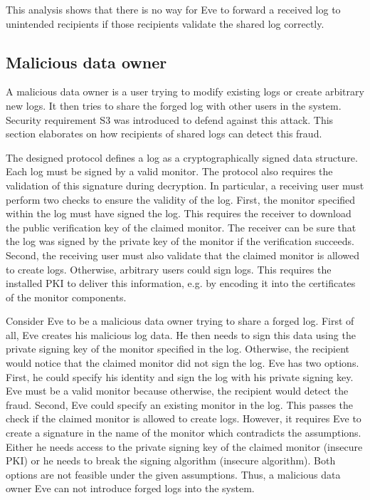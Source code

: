 \documentclass[../main.tex]{subfiles}
\begin{document}
This analysis shows that there is no way for Eve to forward a received log to unintended recipients if those recipients validate the shared log correctly.


\subsection{Malicious data owner}
A malicious data owner is a user trying to modify existing logs or create arbitrary new logs.
It then tries to share the forged log with other users in the system.
Security requirement S3 was introduced to defend against this attack.
This section elaborates on how recipients of shared logs can detect this fraud.

The designed protocol defines a log as a cryptographically signed data structure.
Each log must be signed by a valid monitor.
The protocol also requires the validation of this signature during decryption.
In particular, a receiving user must perform two checks to ensure the validity of the log.
First, the monitor specified within the log must have signed the log.
This requires the receiver to download the public verification key of the claimed monitor.
The receiver can be sure that the log was signed by the private key of the monitor if the verification succeeds.
Second, the receiving user must also validate that the claimed monitor is allowed to create logs.
Otherwise, arbitrary users could sign logs.
This requires the installed PKI to deliver this information, e.g. by encoding it into the certificates of the monitor components.

Consider Eve to be a malicious data owner trying to share a forged log.
First of all, Eve creates his malicious log data.
He then needs to sign this data using the private signing key of the monitor specified in the log.
Otherwise, the recipient would notice that the claimed monitor did not sign the log.
Eve has two options.
First, he could specify his identity and sign the log with his private signing key.
Eve must be a valid monitor because otherwise, the recipient would detect the fraud.
Second, Eve could specify an existing monitor in the log.
This passes the check if the claimed monitor is allowed to create logs.
However, it requires Eve to create a signature in the name of the monitor which contradicts the assumptions.
Either he needs access to the private signing key of the claimed monitor (insecure PKI) or he needs to break the signing algorithm (insecure algorithm).
Both options are not feasible under the given assumptions.
Thus, a malicious data owner Eve can not introduce forged logs into the system.
\end{document}
